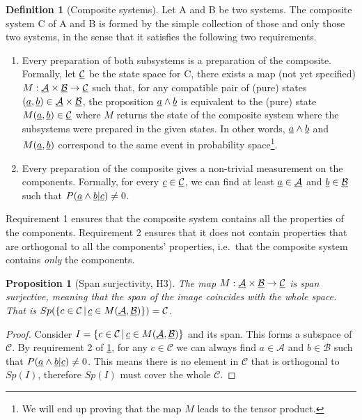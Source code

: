 \documentclass[aps,prl,amsmath,amssymb,twocolumn,nofootinbib]{revtex4}
\theoremstyle{plain}
\newtheorem{prop}[thrm]{Proposition}
\theoremstyle{definition}
\newtheorem{defn}[thrm]{Definition}
\theoremstyle{remark}
\newcommand{\pj}[1] {\underbar{$#1$}}
\begin{document}
	\begin{defn}[Composite systems]\label{def_comp}
		Let A and B be two systems. The composite system C of A and B is formed by the simple collection of those and only those two systems, in the sense that it satisfies the following two requirements.
		\begin{enumerate}
			\item Every preparation of both subsystems is a preparation of the
			composite. Formally, let $\pj{\mathcal{C}}$ be the state space
			for C, there exists a map (not yet specified)
			$M:\pj{\mathcal{A}}\times\pj{\mathcal{B}}\to\pj{\mathcal{C}}$
			such that, for any compatible pair of (pure) states $(\pj{a},\pj{b}) \in \pj{\mathcal{A}}\times\pj{\mathcal{B}}$, the proposition $\pj{a} \wedge \pj{b}$ is equivalent to the (pure) state $M(\pj{a},\pj{b}) \in \pj{\mathcal{C}}$ where $M$ returns the state of the composite system where the subsystems were prepared in the given states. In other words, $\pj{a} \wedge \pj{b}$ and $M(\pj{a},\pj{b})$ correspond to the same event in probability space\footnote{We will end up proving that the map $M$ leads to the tensor product.}.
			\item Every preparation of the composite gives a non-trivial measurement on the components. Formally, for every $\pj{c} \in \pj{\mathcal{C}}$, we can find at least $\pj{a} \in \pj{\mathcal{A}}$ and $\pj{b} \in \pj{\mathcal{B}}$ such that $P(\pj{a} \wedge \pj{b}|\pj{c})\neq 0$. 
		\end{enumerate}
		Requirement 1 ensures that the composite system contains all the properties of the components. Requirement 2 ensures that it does not contain properties that are orthogonal to all the components' properties, i.e.~that the composite system contains {\em only} the components.
	\end{defn}
	
	\begin{prop}[Span surjectivity, H3]\label{prop_spanSurj}
		The map $M :
		\pj{\mathcal{A}}\times\pj{\mathcal{B}} \to \pj{\mathcal{C}}$ is span
		surjective, meaning that the span of the image coincides with the
		whole space. That is $Sp(\{ c \in \mathcal{C} \, | \, \pj{c} \in
		M(\pj{\mathcal{A}}, \pj{\mathcal{B}})\}) = \mathcal{C}$.
	\end{prop}
	\begin{proof}
		Consider $I=\{ c \in \mathcal{C} \, | \, \pj{c} \in M(\pj{\mathcal{A}}, \pj{\mathcal{B}})\}$ and its span. This forms a subspace of $\mathcal{C}$. By requirement 2 of \ref{def_comp}, for any $c \in \mathcal{C}$ we can always find $a \in \mathcal{A}$ and $b \in \mathcal{B}$ such that $P(\pj{a} \wedge \pj{b} | \pj{c} )\neq 0$. This means there is no element in $\mathcal{C}$ that is orthogonal to $Sp(I)$, therefore $Sp(I)$ must cover the whole $\mathcal{C}$.
	\end{proof}
	
\end{document}
